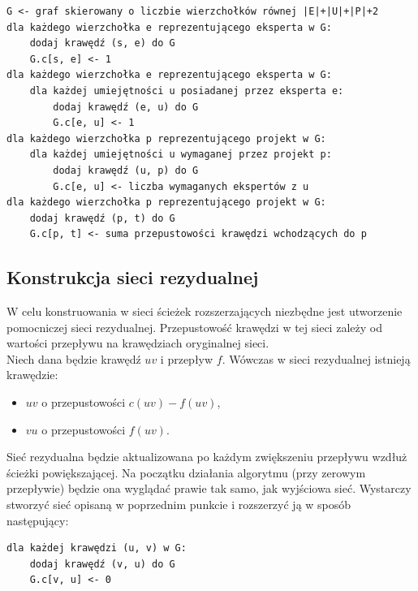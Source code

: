 \documentclass[12pt,a4paper]{article}
\theoremstyle{definition}
\begin{document}
\begin{tcolorbox}[title=Konstrukcja sieci podstawowej]
\begin{verbatim}
G <- graf skierowany o liczbie wierzchołków równej |E|+|U|+|P|+2
dla każdego wierzchołka e reprezentującego eksperta w G:
    dodaj krawędź (s, e) do G
    G.c[s, e] <- 1
dla każdego wierzchołka e reprezentującego eksperta w G:
    dla każdej umiejętności u posiadanej przez eksperta e:
        dodaj krawędź (e, u) do G
        G.c[e, u] <- 1
dla każdego wierzchołka p reprezentującego projekt w G:
    dla każdej umiejętności u wymaganej przez projekt p:
        dodaj krawędź (u, p) do G
        G.c[e, u] <- liczba wymaganych ekspertów z u
dla każdego wierzchołka p reprezentującego projekt w G:
    dodaj krawędź (p, t) do G
    G.c[p, t] <- suma przepustowości krawędzi wchodzących do p
\end{verbatim}
\end{tcolorbox}

\subsection{Konstrukcja sieci rezydualnej}
W celu konstruowania w sieci ścieżek rozszerzających niezbędne jest utworzenie pomocniczej sieci rezydualnej. Przepustowość krawędzi w tej sieci zależy od wartości przepływu na krawędziach oryginalnej sieci.\\

\noindent
Niech dana będzie krawędź $uv$ i przepływ $f$. Wówczas w sieci rezydualnej istnieją krawędzie:
\begin{itemize}
	\item $uv$ o przepustowości $c(uv) - f(uv)$,
	\item $vu$ o przepustowości $f(uv)$.\\
\end{itemize}

\noindent
Sieć rezydualna będzie aktualizowana po każdym zwiększeniu przepływu wzdłuż ścieżki powiększającej. Na początku działania algorytmu (przy zerowym przepływie) będzie ona wyglądać prawie tak samo, jak wyjściowa sieć. Wystarczy stworzyć sieć opisaną w poprzednim punkcie i rozszerzyć ją w sposób następujący:\\

\begin{tcolorbox}[title=Rozszerzenie konstrukcji sieci podstawowej]
\begin{verbatim}
dla każdej krawędzi (u, v) w G:
    dodaj krawędź (v, u) do G
    G.c[v, u] <- 0
\end{verbatim}
\end{tcolorbox}
\end{document}
